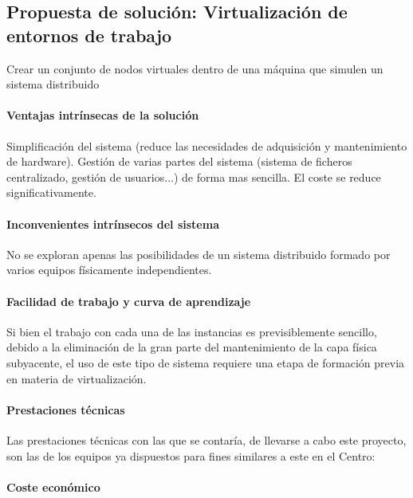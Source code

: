 \subsection{Propuesta de solución: Virtualización de entornos de trabajo}

Crear un conjunto de nodos virtuales dentro de una máquina que simulen un sistema distribuido

\paragraph{Ventajas intrínsecas de la solución}

Simplificación del sistema (reduce las necesidades de adquisición y mantenimiento de hardware).
Gestión de varias partes del sistema (sistema de ficheros centralizado, gestión de usuarios...) de forma mas sencilla. El coste se reduce significativamente.

\paragraph{Inconvenientes intrínsecos del sistema}

No se exploran apenas las posibilidades de un sistema distribuido formado por varios equipos físicamente independientes.

\paragraph{Facilidad de trabajo y curva de aprendizaje}

Si bien el trabajo con cada una de las instancias es previsiblemente sencillo, debido a la eliminación de la gran parte del mantenimiento de la capa física subyacente, el uso de este tipo de sistema requiere una etapa de formación previa en materia de virtualización.

\paragraph{Prestaciones técnicas}

Las prestaciones técnicas con las que se contaría, de llevarse a cabo este proyecto, son las de los equipos ya dispuestos para fines similares a este en el Centro: %

\paragraph{Coste económico}

